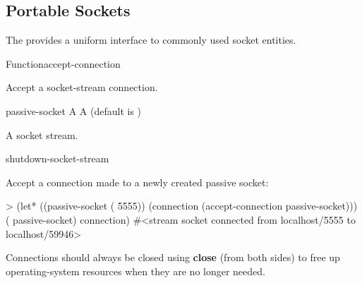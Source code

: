 \documentclass[10pt,twoside,english,pdftex]{article}
\begin{document}

\T\markright{}%
\T\pagestyle{plain}
\T\clearpage
\W{}
\T\pagestyle{fancy}
\T\thispagestyle{fancybottom}
\T\global\def\fnlastname{ }%
\subsection{Portable Sockets}
\label{sec:portablesockets}%

%
%
%
The   provides a uniform interface to
commonly used socket entities.

\W\entities
\T\clearpage


\begin{functiondoc}{Function}{accept-connection}{
     
    \returns{} } 
%
%
%

\fnsyntax

\fnpurpose Accept a socket-stream connection.

\fnpackage {}

\fnmodule {}

\fnargs
\begin{args}{passive-socket}
 A 
\arg[wait] A  (default is )
\end{args}

\fnreturns A socket stream.

\begin{alsos}{shutdown-socket-stream}
\end{alsos}

%
%
\fnexample
Accept a connection made to a newly created passive socket:
%
\W\supp
\begin{example}
> (let* ((passive-socket ( 5555))
         (connection (accept-connection passive-socket)))
     ( passive-socket)
     connection)
#<stream socket connected from localhost/5555 to localhost/59946>
\end{example}

\fnnote Connections should always be closed using \textbf{close}
(from both sides) to free up operating-system resources when they are
no longer needed.

\end{functiondoc}
\end{document}
